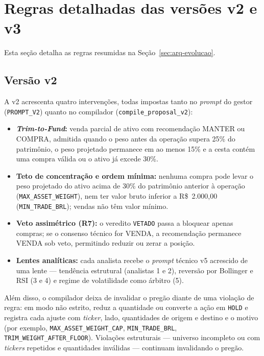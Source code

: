 \section{Regras detalhadas das versões v2 e v3}

Esta seção detalha as regras resumidas na Seção~\ref{sec:arq-evolucao}.

\subsection{Versão v2}

A v2 acrescenta quatro intervenções, todas impostas tanto no \textit{prompt} do gestor (\texttt{PROMPT\_V2}) quanto no compilador (\texttt{compile\_proposal\_v2}):

\begin{itemize}
  \item \textbf{\textit{Trim-to-Fund}:} venda parcial de ativo com recomendação MANTER ou COMPRA, admitida quando o peso antes da operação supera 25\% do patrimônio, o peso projetado permanece em ao menos 15\% e a cesta contém uma compra válida ou o ativo já excede 30\%.
  \item \textbf{Teto de concentração e ordem mínima:} nenhuma compra pode levar o peso projetado do ativo acima de 30\% do patrimônio anterior à operação (\texttt{MAX\_ASSET\_WEIGHT}), nem ter valor bruto inferior a R\$~2.000,00 (\texttt{MIN\_TRADE\_BRL}); vendas não têm valor mínimo.
  \item \textbf{Veto assimétrico (R7):} o veredito \texttt{VETADO} passa a bloquear apenas compras; se o consenso técnico for VENDA, a recomendação permanece VENDA sob veto, permitindo reduzir ou zerar a posição.
  \item \textbf{Lentes analíticas:} cada analista recebe o \textit{prompt} técnico v5 acrescido de uma lente --- tendência estrutural (analistas 1 e 2), reversão por Bollinger e RSI (3 e 4) e regime de volatilidade como árbitro (5).
\end{itemize}

Além disso, o compilador deixa de invalidar o pregão diante de uma violação de regra: em modo não estrito, reduz a quantidade ou converte a ação em \texttt{HOLD} e registra cada ajuste com \textit{ticker}, lado, quantidades de origem e destino e o motivo (por exemplo, \texttt{MAX\_ASSET\_WEIGHT\_CAP}, \texttt{MIN\_TRADE\_BRL}, \texttt{TRIM\_WEIGHT\_AFTER\_FLOOR}). Violações estruturais --- universo incompleto ou com \textit{tickers} repetidos e quantidades inválidas --- continuam invalidando o pregão.

